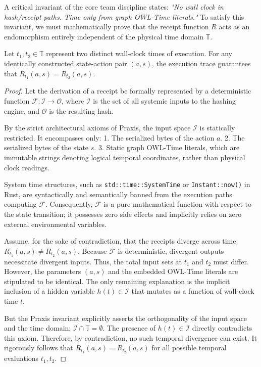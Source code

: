A critical invariant of the core team discipline states: \textit{"No wall clock in hash/receipt paths. Time only from graph OWL-Time literals."} To satisfy this invariant, we must mathematically prove that the receipt function $R$ acts as an endomorphism entirely independent of the physical time domain $\mathbb{T}$.

\begin{theorem}
\label{thm:temporal_independence}
Let $t_1, t_2 \in \mathbb{T}$ represent two distinct wall-clock times of execution. For any identically constructed state-action pair $(a, s)$, the execution trace guarantees that $R_{t_1}(a, s) = R_{t_2}(a, s)$.
\end{theorem}

\begin{proof}
Let the derivation of a receipt be formally represented by a deterministic function $\mathcal{F}: \mathcal{I} \rightarrow \mathcal{O}$, where $\mathcal{I}$ is the set of all systemic inputs to the hashing engine, and $\mathcal{O}$ is the resulting hash. 

By the strict architectural axioms of Praxis, the input space $\mathcal{I}$ is statically restricted. It encompasses only:
1. The serialized bytes of the action $a$.
2. The serialized bytes of the state $s$.
3. Static graph OWL-Time literals, which are immutable strings denoting logical temporal coordinates, rather than physical clock readings.

System time structures, such as \texttt{std::time::SystemTime} or \texttt{Instant::now()} in Rust, are syntactically and semantically banned from the execution paths computing $\mathcal{F}$. Consequently, $\mathcal{F}$ is a pure mathematical function with respect to the state transition; it possesses zero side effects and implicitly relies on zero external environmental variables.

Assume, for the sake of contradiction, that the receipts diverge across time: $R_{t_1}(a, s) \neq R_{t_2}(a, s)$. Because $\mathcal{F}$ is deterministic, divergent outputs necessitate divergent inputs. Thus, the total input sets at $t_1$ and $t_2$ must differ. 
However, the parameters $(a, s)$ and the embedded OWL-Time literals are stipulated to be identical. The only remaining explanation is the implicit inclusion of a hidden variable $h(t) \in \mathcal{I}$ that mutates as a function of wall-clock time $t$. 

But the Praxis invariant explicitly asserts the orthogonality of the input space and the time domain: $\mathcal{I} \cap \mathbb{T} = \emptyset$. The presence of $h(t) \in \mathcal{I}$ directly contradicts this axiom. 
Therefore, by contradiction, no such temporal divergence can exist. It rigorously follows that $R_{t_1}(a, s) = R_{t_2}(a, s)$ for all possible temporal evaluations $t_1, t_2$.
\end{proof}

